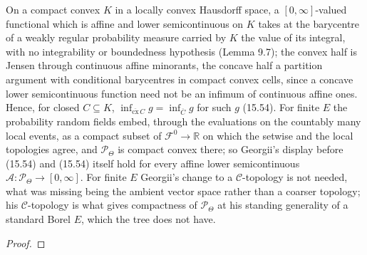 \begin{theorem}
    \label{thm:ld-15-54}
    \leanok

    On a compact convex $K$ in a locally convex Hausdorff space, a $[0,\infty]$-valued functional
    which is affine and lower semicontinuous on $K$ takes at the barycentre of a weakly regular
    probability measure carried by $K$ the value of its integral, with no integrability or
    boundedness hypothesis (Lemma 9.7); the convex half is Jensen through continuous affine
    minorants, the concave half a partition argument with conditional barycentres in compact
    convex cells, since a concave lower semicontinuous function need not be an infimum of
    continuous affine ones. Hence, for closed $C \subseteq K$, $\inf_{\overline{\mathrm{cx}}\,C} g =
    \inf_{\overline C} g$ for such $g$ (15.54). For finite $E$ the probability random fields embed,
    through the evaluations on the countably many local events, as a compact subset of
    $\mathcal F^0 \to \mathbb R$ on which the setwise and the local topologies agree, and
    $\mathcal P_\Theta$ is compact convex there; so Georgii's display before (15.54) and (15.54)
    itself hold for every affine lower semicontinuous $\mathcal A : \mathcal P_\Theta \to [0,\infty]$.
    For finite $E$ Georgii's change to a $\mathcal C$-topology is not needed, what was missing
    being the ambient vector space rather than a coarser topology; his $\mathcal C$-topology is
    what gives compactness of $\mathcal P_\Theta$ at his standing generality of a standard Borel
    $E$, which the tree does not have.
\end{theorem}
\begin{proof}
    \leanok
\end{proof}

